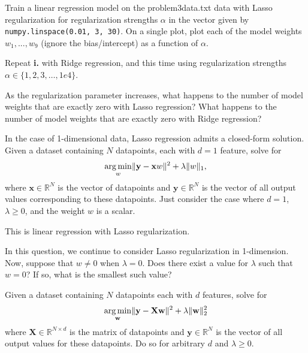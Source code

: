 \documentclass{article}
\begin{document}
\subproblem
Train a linear regression model on the problem3data.txt data with Lasso regularization for regularization strengths $\alpha$ in the vector given by \texttt{numpy.linspace(0.01, 3, 30)}.
On a single plot, plot each of the model weights $w_1, ..., w_9$ (ignore the bias/intercept) as a function of $\alpha$.

\subproblem
Repeat \textbf{i.} with Ridge regression, and this time using regularization strengths $\alpha \in \{1, 2, 3, \ldots, 1e4\}$.


\subproblem
As the regularization parameter increases, what happens to the number of model weights that are exactly zero with Lasso regression?
What happens to the number of model weights that are exactly zero with Ridge regression?

\medskip
\lstset{
  basicstyle=\small\ttfamily,
  breaklines=true,
  columns=fullflexible
}

\begin{solution}

\end{solution}

\problem[9]

\subproblem
In the case of 1-dimensional data, Lasso regression admits a closed-form solution.
Given a dataset containing $N$ datapoints, each with $d = 1$ feature, solve for
\[\underset{w}{\operatorname{arg\,min}} \Vert\mathbf{y} - \mathbf{x}w\Vert^2 + \lambda\Vert w\Vert_1,
\]
where $\mathbf{x} \in \mathbb{R}^{N}$ is the vector of datapoints and $\mathbf{y} \in \mathbb{R}^N$ is the  vector of all output values corresponding to these datapoints. Just consider the case where $d = 1$, $\lambda \geq 0$, and the weight $w$ is a scalar.

This is linear regression with Lasso regularization.

\begin{subsolution}
 
\end{subsolution}

\subproblem
In this question, we continue to consider Lasso regularization in 1-dimension. Now, suppose that $w \neq 0$ when $\lambda = 0$. Does there exist a value for $\lambda$ such that $w = 0$? If so, what is the smallest such value?

\begin{subsolution}
  
\end{subsolution}

\problem[9]
\subproblem
Given a dataset containing $N$ datapoints each with $d$ features, solve for
\[\underset{\mathbf{w}}{\operatorname{arg\,min}} \Vert\mathbf{y} - \mathbf{X}\mathbf{w}\Vert^2 + \lambda\Vert\mathbf{w}\Vert_2^2
\]
where $\mathbf{X} \in \mathbb{R}^{N \times d}$ is the matrix of datapoints and $\mathbf{y} \in \mathbb{R}^N$ is the  vector of all output values for these datapoints. Do so for arbitrary $d$ and $\lambda \geq 0$.
\end{document}

